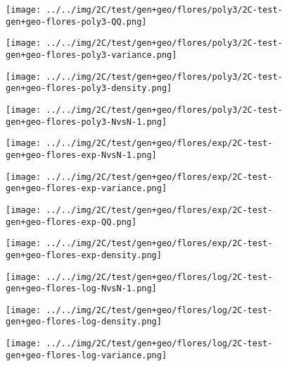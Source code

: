 \begin{figure}[H]
\centering	\texttt{[image: ../../img/2C/test/gen+geo/flores/poly3/2C-test-gen+geo-flores-poly3-QQ.png]}
\end{figure}
\begin{figure}[H]
\centering	\texttt{[image: ../../img/2C/test/gen+geo/flores/poly3/2C-test-gen+geo-flores-poly3-variance.png]}
\end{figure}
\begin{figure}[H]
\centering	\texttt{[image: ../../img/2C/test/gen+geo/flores/poly3/2C-test-gen+geo-flores-poly3-density.png]}
\end{figure}
\begin{figure}[H]
\centering	\texttt{[image: ../../img/2C/test/gen+geo/flores/poly3/2C-test-gen+geo-flores-poly3-NvsN-1.png]}
\end{figure}
\begin{figure}[H]
\centering	\texttt{[image: ../../img/2C/test/gen+geo/flores/exp/2C-test-gen+geo-flores-exp-NvsN-1.png]}
\end{figure}
\begin{figure}[H]
\centering	\texttt{[image: ../../img/2C/test/gen+geo/flores/exp/2C-test-gen+geo-flores-exp-variance.png]}
\end{figure}
\begin{figure}[H]
\centering	\texttt{[image: ../../img/2C/test/gen+geo/flores/exp/2C-test-gen+geo-flores-exp-QQ.png]}
\end{figure}
\begin{figure}[H]
\centering	\texttt{[image: ../../img/2C/test/gen+geo/flores/exp/2C-test-gen+geo-flores-exp-density.png]}
\end{figure}
\begin{figure}[H]
\centering	\texttt{[image: ../../img/2C/test/gen+geo/flores/log/2C-test-gen+geo-flores-log-NvsN-1.png]}
\end{figure}
\begin{figure}[H]
\centering	\texttt{[image: ../../img/2C/test/gen+geo/flores/log/2C-test-gen+geo-flores-log-density.png]}
\end{figure}
\begin{figure}[H]
\centering	\texttt{[image: ../../img/2C/test/gen+geo/flores/log/2C-test-gen+geo-flores-log-variance.png]}
\end{figure}

